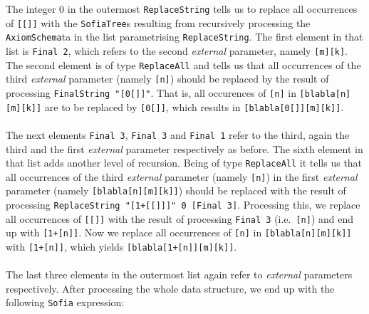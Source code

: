 \documentclass[notitlepage]{report}
\newcommand\m[1]{\texttt{#1}}
\begin{document}
The integer 0 in the outermost \m{ReplaceString} tells us to replace all
occurrences of \texttt{[[]]} with the \m{SofiaTree}s resulting from recursively
processing the \m{AxiomSchema}ta in the list parametrising \m{ReplaceString}. The
first element in that list is \m{Final 2}, which refers to the second
\emph{external} parameter, namely \texttt{[m][k]}. The second element is of type
\m{ReplaceAll} and tells us that all occurrences of the third \emph{external}
parameter (namely \texttt{[n]}) should be replaced by the result of processing
\m{FinalString "[0[]]"}. That is, all occurences of \texttt{[n]} in
\texttt{[blabla[n][m][k]]} are to be replaced by \texttt{[0[]]}, which results
in \texttt{[blabla[0[]][m][k]]}.
\\\\
The next elements \m{Final 3}, \m{Final 3} and \m{Final 1} refer to the
third, again the third and the first \emph{external} parameter respectively as
before. The sixth element in that list adds another level of recursion. Being of
type \m{ReplaceAll} it tells us that all occurrences of the third
\emph{external} parameter (namely \texttt{[n]}) in the first \emph{external}
parameter (namely \texttt{[blabla[n][m][k]]}) should be replaced with the result
of processing \m{ReplaceString "[1+[[]]]" 0 [Final 3]}. Processing this, we
replace all occurrences of \texttt{[[]]} with the result of processing
\m{Final 3} (i.e.\ \texttt{[n]}) and end up with \texttt{[1+[n]]}. Now we
replace all occurrences of \texttt{[n]} in \texttt{[blabla[n][m][k]]} with
\texttt{[1+[n]]}, which yields \texttt{[blabla[1+[n]][m][k]]}.
\\\\
The last three elements in the outermost list again refer to \emph{external}
parameters respectively. After processing the whole data structure, we end up
with the following \m{Sofia} expression:
\begin{quote}\vbox%
{\haddockverb\begin{verbatim}
[[m][k][blabla[n][m][k]][[n][[n]nat][blabla[n][m][k]]:[blabla[n][m][k]]]:
 [[n][[n]nat]:[blabla[n][m][k]]]] 
\end{verbatim}}
\end{quote}



\pagebreak
\begingroup
{}
\setlength\bibitemsep{10pt}
\printbibliography\
\endgroup
\end{document}
